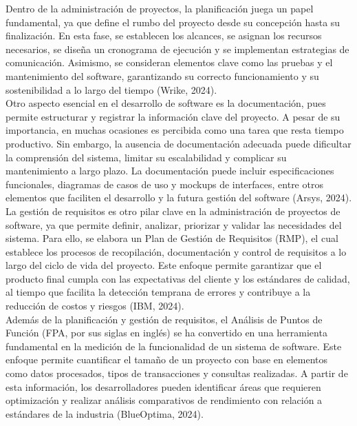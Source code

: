 \documentclass[12pt,letterpaper,spanish, xcolor=table]{report}
\numberwithin{figure}{subsection}
\begin{document}
Dentro de la administración de proyectos, la planificación juega un papel fundamental, ya que define el rumbo del proyecto desde su concepción hasta su finalización. En esta fase, se establecen los alcances, se asignan los recursos necesarios, se diseña un cronograma de ejecución y se implementan estrategias de comunicación. Asimismo, se consideran elementos clave como las pruebas y el mantenimiento del software, garantizando su correcto funcionamiento y su sostenibilidad a lo largo del tiempo (Wrike, 2024).\\

Otro aspecto esencial en el desarrollo de software es la documentación, pues permite estructurar y registrar la información clave del proyecto. A pesar de su importancia, en muchas ocasiones es percibida como una tarea que resta tiempo productivo. Sin embargo, la ausencia de documentación adecuada puede dificultar la comprensión del sistema, limitar su escalabilidad y complicar su mantenimiento a largo plazo. La documentación puede incluir especificaciones funcionales, diagramas de casos de uso y mockups de interfaces, entre otros elementos que faciliten el desarrollo y la futura gestión del software (Arsys, 2024).\\

La gestión de requisitos es otro pilar clave en la administración de proyectos de software, ya que permite definir, analizar, priorizar y validar las necesidades del sistema. Para ello, se elabora un Plan de Gestión de Requisitos (RMP), el cual establece los procesos de recopilación, documentación y control de requisitos a lo largo del ciclo de vida del proyecto. Este enfoque permite garantizar que el producto final cumpla con las expectativas del cliente y los estándares de calidad, al tiempo que facilita la detección temprana de errores y contribuye a la reducción de costos y riesgos (IBM, 2024).\\

Además de la planificación y gestión de requisitos, el Análisis de Puntos de Función (FPA, por sus siglas en inglés) se ha convertido en una herramienta fundamental en la medición de la funcionalidad de un sistema de software. Este enfoque permite cuantificar el tamaño de un proyecto con base en elementos como datos procesados, tipos de transacciones y consultas realizadas. A partir de esta información, los desarrolladores pueden identificar áreas que requieren optimización y realizar análisis comparativos de rendimiento con relación a estándares de la industria (BlueOptima, 2024).\\
\end{document}
